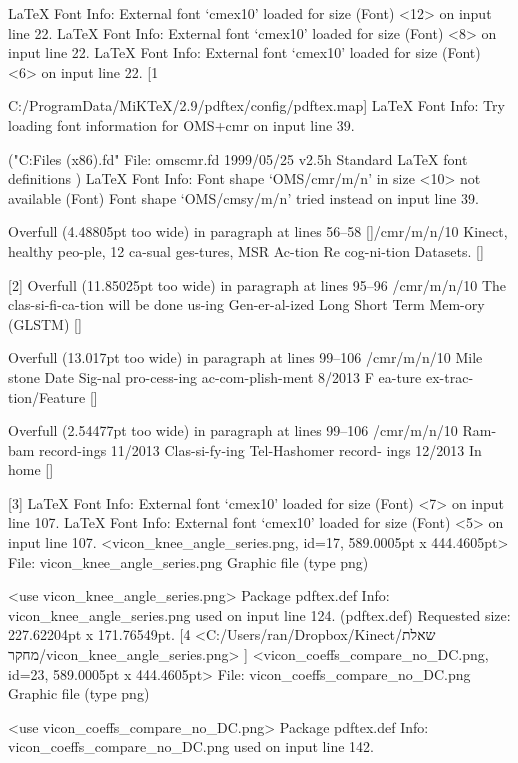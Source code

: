 LaTeX Font Info:    External font `cmex10' loaded for size
(Font)              <12> on input line 22.
LaTeX Font Info:    External font `cmex10' loaded for size
(Font)              <8> on input line 22.
LaTeX Font Info:    External font `cmex10' loaded for size
(Font)              <6> on input line 22.
[1

{C:/ProgramData/MiKTeX/2.9/pdftex/config/pdftex.map}]
LaTeX Font Info:    Try loading font information for OMS+cmr on input line 39.

("C:\Program Files (x86)\tex\latex\base\omscmr.fd"
File: omscmr.fd 1999/05/25 v2.5h Standard LaTeX font definitions
)
LaTeX Font Info:    Font shape `OMS/cmr/m/n' in size <10> not available
(Font)              Font shape `OMS/cmsy/m/n' tried instead on input line 39.

Overfull \hbox (4.48805pt too wide) in paragraph at lines 56--58
[]/cmr/m/n/10 Kinect, healthy peo-ple, 12 ca-sual ges-tures, MSR Ac-tion Re
cog-ni-tion Datasets. 
 []

[2]
Overfull \hbox (11.85025pt too wide) in paragraph at lines 95--96
/cmr/m/n/10 The clas-si-fi-ca-tion will be done us-ing Gen-er-al-ized Long 
Short Term Mem-ory (GLSTM)
 []


Overfull \hbox (13.017pt too wide) in paragraph at lines 99--106
/cmr/m/n/10 Mile stone Date Sig-nal pro-cess-ing ac-com-plish-ment 8/2013 F
ea-ture ex-trac-tion/Feature
 []


Overfull \hbox (2.54477pt too wide) in paragraph at lines 99--106
/cmr/m/n/10 Ram-bam record-ings 11/2013 Clas-si-fy-ing Tel-Hashomer record-
ings 12/2013 In home
 []

[3]
LaTeX Font Info:    External font `cmex10' loaded for size
(Font)              <7> on input line 107.
LaTeX Font Info:    External font `cmex10' loaded for size
(Font)              <5> on input line 107.
 <vicon_knee_angle_series.png, id=17, 589.0005pt x 444.4605pt>
File: vicon_knee_angle_series.png Graphic file (type png)

<use vicon_knee_angle_series.png>
Package pdftex.def Info: vicon_knee_angle_series.png used on input line 124.
(pdftex.def)             Requested size: 227.62204pt x 171.76549pt.
 [4 <C:/Users/ran/Dropbox/Kinect/שאלת מחקר/vicon_knee_angle_series.png>
]
<vicon_coeffs_compare_no_DC.png, id=23, 589.0005pt x 444.4605pt>
File: vicon_coeffs_compare_no_DC.png Graphic file (type png)

<use vicon_coeffs_compare_no_DC.png>
Package pdftex.def Info: vicon_coeffs_compare_no_DC.png used on input line 142.

